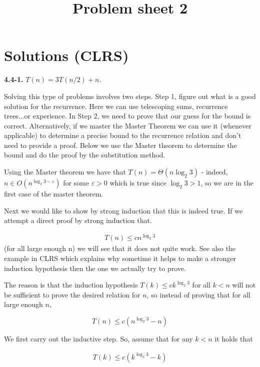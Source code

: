 \documentclass{article}
\title{Problem sheet 2}
\date{}
\newcommand{\Oh}{O}
\renewcommand{\leq}{\leqslant}
\renewcommand{\epsilon}{\varepsilon}
\begin{document}
\maketitle

\section*{Solutions (CLRS)}

\noindent\textbf{4.4-1.} $T(n) = 3T(n / 2) + n$.

Solving this type of problems 
involves two steps. Step 1, figure out what is a good solution for the recurrence. Here we can use telescoping sums, recurrence trees...or experience. In Step 2, we need to prove that our guess for the bound is correct. Alternatively, if we master the Master Theorem we can use it (whenever applicable) to determine a precise bound to the recurrence relation and don't need to provide a proof. Below we use the Master theorem to determine the bound and do the proof by the substitution method.

Using the Master theorem we have that $T(n) = \Theta(n\log_2{3})$ - indeed, $n \in \Oh(n^{\log_2{3} - \epsilon})$ for some $\epsilon > 0$ which is true since $\log_2{3} > 1$, so we are in the first case of the master theorem.

Next we would like to show by strong induction that this is indeed true. If we attempt a direct proof by strong induction that.

\begin{align*} T(n) \leq cn^{\log_{2}3}
\end{align*}
(for all large enough n) we will see that it does not quite work. See also the example in CLRS which explains why sometime it helps to make a stronger induction hypothesis then the one we actually try to prove.

The reason is that the induction hypothesis $T(k) \leq ck^{\log_2{3}}$ for all $k < n$ will not be sufficient to prove the desired relation for $n$, so instead of proving that for all large enough $n$,

\begin{equation*}
T(n) \leq c(n^{\log_2{3}} - n)
\end{equation*}

We first carry out the inductive step. So, assume that for any $k < n$ it holds that

\begin{align*} T(k) \leq c(k^{\log_2 3} -k)
\end{align*}
\end{document}
